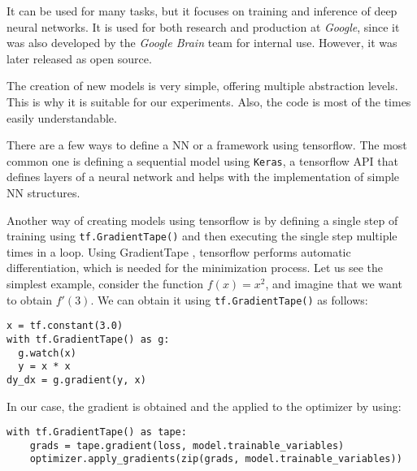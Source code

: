 


It can be used for many tasks, but it focuses on training and inference of deep neural networks. It is used for both research and production at \emph{Google}, since it was also developed by the \emph{Google Brain} team for internal use. However, it was later released as open source.

The creation of new models is very simple, offering multiple abstraction levels. This is why it is suitable for our experiments. Also, the code is most of the times easily understandable.

There are a few ways to define a NN or a framework using tensorflow. The most common one is defining a sequential model using \lstinline{Keras}, a tensorflow API that defines layers of a neural network and helps with the implementation of simple NN structures.%


Another way of creating models using tensorflow is by defining a single step of training using \lstinline{tf.GradientTape()} and then executing the single step multiple times in a loop. Using GradientTape , tensorflow performs automatic differentiation, which is needed for the minimization process. Let us see the simplest example, consider the function $f(x) = x^2$, and imagine that we want to obtain $f'(3)$. We can obtain it using \lstinline{tf.GradientTape()} as follows:

\begin{verbatim}
x = tf.constant(3.0)
with tf.GradientTape() as g:
  g.watch(x)
  y = x * x
dy_dx = g.gradient(y, x)
\end{verbatim}

In our case, the gradient is obtained and the applied to the optimizer by using:

\begin{verbatim}
with tf.GradientTape() as tape:
    grads = tape.gradient(loss, model.trainable_variables)
    optimizer.apply_gradients(zip(grads, model.trainable_variables))
\end{verbatim}


